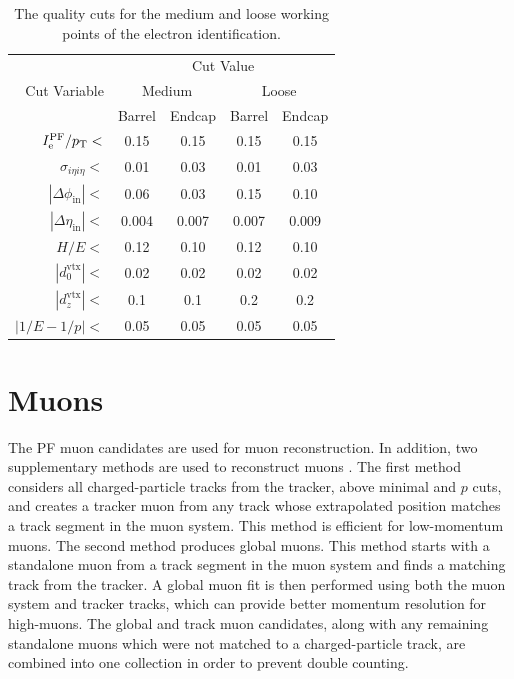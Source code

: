 \begin{table}[htb]
  \begin{center}
    \begin{tabular}{|r|c|c|c|c|}
      \hline
      \multirow{3}{*}{Cut Variable} & \multicolumn{4}{|c|}{Cut Value} \\
      \cline{2-5}
                                    & \multicolumn{2}{|c|}{Medium} & \multicolumn{2}{|c|}{Loose} \\
      \cline{2-5}
                                    & Barrel & Endcap & Barrel  & Endcap    \\
      \hline
      $I^{\text{PF}}_{\mathrm{e}}/p_{\mathrm{T}}<$    & 0.15     & 0.15     & 0.15      & 0.15      \\      
      $\sigma_{i\eta i\eta}<$       & 0.01     & 0.03     & 0.01      & 0.03    \\ 
      $|\Delta\phi_{\text{in}}|<$   & 0.06     & 0.03     & 0.15      & 0.10    \\ 
      $|\Delta\eta_{\text{in}}|<$   & 0.004    & 0.007    & 0.007     & 0.009    \\ 
      $H/E<$                        & 0.12     & 0.10     & 0.12      & 0.10     \\ 
      $|d_0^{\text{vtx}}|<$         & 0.02     & 0.02     & 0.02      & 0.02     \\              
      $|d_z^{\text{vtx}}|<$         & 0.1      & 0.1      & 0.2       & 0.2      \\              
      $|1/E - 1/p|<$                & 0.05     & 0.05     & 0.05      & 0.05     \\
      \hline
    \end{tabular}
    \caption{The quality cuts for the medium and loose working points of the electron identification. }
    \label{tab:eleWP}
  \end{center}
\end{table}

\section{Muons
\label{sec:muon-reco}}

The PF muon candidates are used for muon reconstruction. In addition, two supplementary methods are used to reconstruct muons \cite{CMS-PAS-MUO-10-002}. The first method considers all charged-particle tracks from the tracker, above minimal \pt and $p$ cuts, and creates a tracker muon from any track whose extrapolated position matches a track segment in the muon system. This method is efficient for low-momentum muons. The second method produces global muons. This method starts with a standalone muon from a track segment in the muon system and finds a matching track from the tracker. A global muon fit is then performed using both the muon system and tracker tracks, which can provide better momentum resolution for high-\pt muons. The global and track muon candidates, along with any remaining standalone muons which were not matched to a charged-particle track, are combined into one collection in order to prevent double counting.

